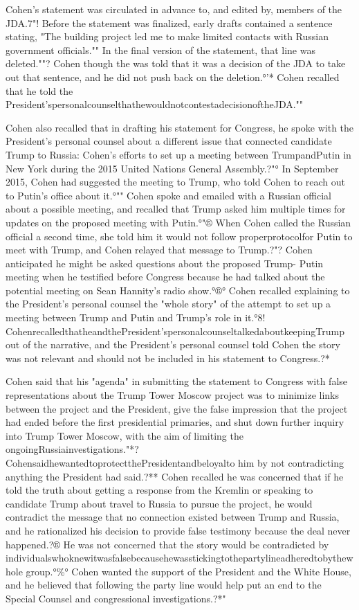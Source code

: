 Cohen's statement was circulated in advance to, and edited by, members of the JDA.7"!
Before the statement was finalized, early drafts contained a sentence stating, "The building project led me to make limited contacts with Russian government officials.""
In the final version of the statement, that line was deleted.""?
Cohen though the was told that it was a decision of the JDA to take out that sentence, and he did not push back on the deletion.°'*
Cohen recalled that he told the President'spersonalcounselthathewouldnotcontestadecisionoftheJDA.""

Cohen also recalled that in drafting his statement for Congress, he spoke with the President's personal counsel about a different issue that connected candidate Trump to Russia: Cohen's efforts to set up a meeting between TrumpandPutin in New York during the 2015 United Nations General Assembly.?"°
In September 2015, Cohen had suggested the meeting to Trump, who told Cohen to reach out to Putin's office about it.°""
Cohen spoke and emailed with a Russian official about a possible meeting, and recalled that Trump asked him multiple times for updates on the proposed meeting with Putin.°"®
When Cohen called the Russian official a second time, she told him it would not follow properprotocolfor Putin to meet with Trump, and Cohen relayed that message to Trump.?"?
Cohen anticipated he might be asked questions about the proposed Trump- Putin meeting when he testified before Congress because he had talked about the potential meeting on Sean Hannity's radio show.°®°
Cohen recalled explaining to the President's personal counsel the "whole story" of the attempt to set up a meeting between Trump and Putin and Trump's role in it.°8!
CohenrecalledthatheandthePresident'spersonalcounseltalkedaboutkeepingTrump out of the narrative, and the President's personal counsel told Cohen the story was not relevant and should not be included in his statement to Congress.?*

Cohen said that his "agenda" in submitting the statement to Congress with false representations about the Trump Tower Moscow project was to minimize links between the project and the President, give the false impression that the project had ended before the first presidential primaries, and shut down further inquiry into Trump Tower Moscow, with the aim of limiting the ongoingRussiainvestigations."*?
CohensaidhewantedtoprotectthePresidentandbeloyalto him by not contradicting anything the President had said.?**
Cohen recalled he was concerned that if he told the truth about getting a response from the Kremlin or speaking to candidate Trump about travel to Russia to pursue the project, he would contradict the message that no connection existed between Trump and Russia, and he rationalized his decision to provide false testimony because the deal never happened.?®
He was not concerned that the story would be contradicted by individualswhoknewitwasfalsebecausehewasstickingtothepartylineadheredtobythewhole group.°\%°
Cohen wanted the support of the President and the White House, and he believed that following the party line would help put an end to the Special Counsel and congressional investigations.?*"

